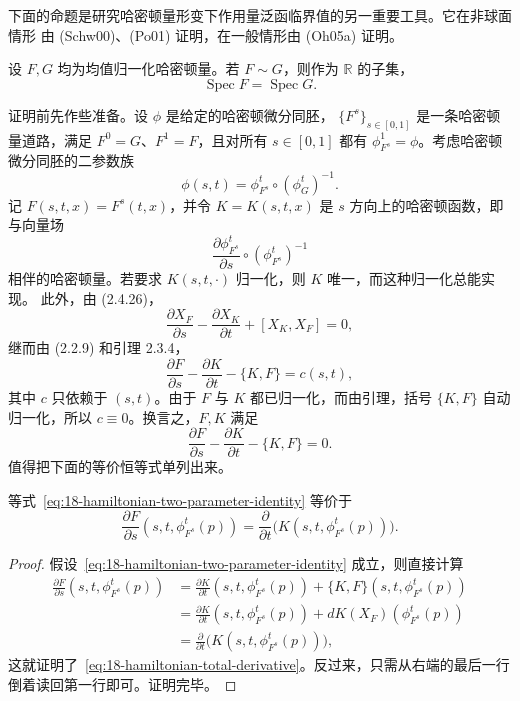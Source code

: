 下面的命题是研究哈密顿量形变下作用量泛函临界值的另一重要工具。它在非球面情形
由 (Schw00)、(Po01) 证明，在一般情形由 (Oh05a) 证明。

\begin{proposition}
\label{prop:18-homotopic-hamiltonians-same-spectrum}
设 $F,G$ 均为均值归一化哈密顿量。若 $F\sim G$，则作为 $\mathbb R$ 的子集，
\[
 \operatorname{Spec}F=\operatorname{Spec}G.
\]
\end{proposition}

证明前先作些准备。设 $\phi$ 是给定的哈密顿微分同胚，
$\{F^s\}_{s\in[0,1]}$ 是一条哈密顿量道路，满足
$F^0=G$、$F^1=F$，且对所有 $s\in[0,1]$ 都有 $\phi_{F^s}^1=\phi$。考虑哈密顿
微分同胚的二参数族
\[
 \phi(s,t)=\phi_{F^s}^t\circ(\phi_G^t)^{-1}.
\]
记 $F(s,t,x)=F^s(t,x)$，并令 $K=K(s,t,x)$ 是 $s$ 方向上的哈密顿函数，即与向量场
\[
 \frac{\partial\phi_{F^s}^t}{\partial s}\circ(\phi_{F^s}^t)^{-1}
\]
相伴的哈密顿量。若要求 $K(s,t,\cdot)$ 归一化，则 $K$ 唯一，而这种归一化总能实现。
此外，由 (2.4.26)，
\[
 \frac{\partial X_F}{\partial s}-\frac{\partial X_K}{\partial t}
 +[X_K,X_F]=0,
\]
继而由 (2.2.9) 和引理 2.3.4，
\[
 \frac{\partial F}{\partial s}-\frac{\partial K}{\partial t}-\{K,F\}=c(s,t),
\]
其中 $c$ 只依赖于 $(s,t)$。由于 $F$ 与 $K$ 都已归一化，而由\personLiouville{}引理，\personPoisson{}括号 $\{K,F\}$ 自动归一化，所以 $c\equiv0$。换言之，$F,K$ 满足
\begin{equation}
 \frac{\partial F}{\partial s}-\frac{\partial K}{\partial t}-\{K,F\}=0.
 \label{eq:18-hamiltonian-two-parameter-identity}
\end{equation}
值得把下面的等价恒等式单列出来。

\begin{lemma}
\label{lem:18-equivalent-two-parameter-identity}
等式~\eqref{eq:18-hamiltonian-two-parameter-identity} 等价于
\begin{equation}
 \frac{\partial F}{\partial s}(s,t,\phi_{F^s}^t(p))
 =\frac\partial{\partial t}\bigl(K(s,t,\phi_{F^s}^t(p))\bigr).
 \label{eq:18-hamiltonian-total-derivative}
\end{equation}
\end{lemma}

\begin{proof}
假设~\eqref{eq:18-hamiltonian-two-parameter-identity} 成立，则直接计算
\begin{align*}
 \frac{\partial F}{\partial s}(s,t,\phi_{F^s}^t(p))
 &=\frac{\partial K}{\partial t}(s,t,\phi_{F^s}^t(p))
   +\{K,F\}(s,t,\phi_{F^s}^t(p))\\
 &=\frac{\partial K}{\partial t}(s,t,\phi_{F^s}^t(p))
   +dK(X_F)(\phi_{F^s}^t(p))\\
 &=\frac\partial{\partial t}\bigl(K(s,t,\phi_{F^s}^t(p))\bigr),
\end{align*}
这就证明了~\eqref{eq:18-hamiltonian-total-derivative}。反过来，只需从右端的最后一行
倒着读回第一行即可。证明完毕。
\end{proof}

